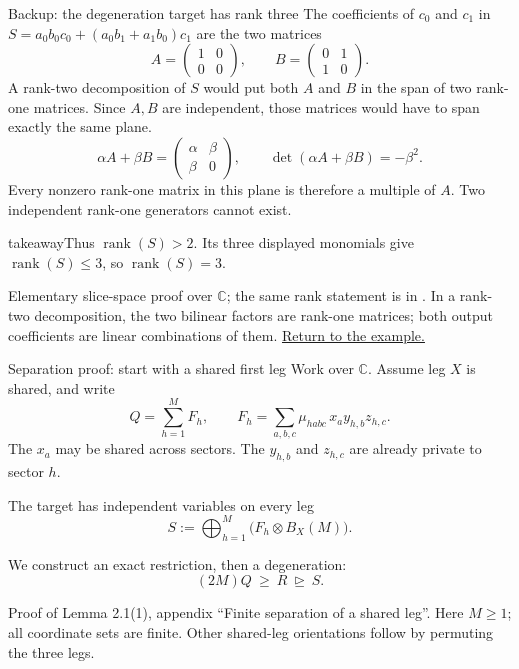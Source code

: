 \documentclass[aspectratio=169,11pt]{beamer}
\newcommand{\CC}{\mathbb C}
\newcommand{\rank}{\operatorname{rank}}
\newcommand{\degen}{\unrhd}
\newcommand{\source}[1]{\vfill\par{\fontsize{7.5}{9}\selectfont\color{muted}#1\par}}
\newcommand{\takeaway}[1]{\begin{beamercolorbox}[sep=0.65em,wd=\linewidth]{takeaway}#1\end{beamercolorbox}}
\begin{document}
\begin{frame}[label=degeneration-rank-proof]{Backup: the degeneration target has rank three}
  The coefficients of $c_0$ and $c_1$ in
  $S=a_0b_0c_0+(a_0b_1+a_1b_0)c_1$ are the two matrices
  \[
    A=\begin{pmatrix}1&0\\0&0\end{pmatrix},\qquad
    B=\begin{pmatrix}0&1\\1&0\end{pmatrix}.
  \]
  A rank-two decomposition of $S$ would put both $A$ and $B$ in the span
  of two rank-one matrices. Since $A,B$ are independent, those matrices
  would have to span exactly the same plane.
  \[
    \alpha A+\beta B=\begin{pmatrix}\alpha&\beta\\\beta&0\end{pmatrix},
    \qquad \det(\alpha A+\beta B)=-\beta^2.
  \]
  Every nonzero rank-one matrix in this plane is therefore a multiple of $A$.
  Two independent rank-one generators cannot exist.
  \par\medskip
  \takeaway{Thus $\rank(S)>2$. Its three displayed monomials give
    $\rank(S)\le3$, so $\rank(S)=3$.}
  \source{Elementary slice-space proof over $\CC$; the same rank statement is in
  \cite[proof of Proposition 13, p.~131]{interpolation}.
  In a rank-two decomposition, the two bilinear factors are rank-one matrices;
  both output coefficients are linear combinations of them.
  \hyperlink{degeneration-example}{Return to the example.}}
\end{frame}

\begin{frame}[label=finite-separation-setup]{Separation proof: start with a shared first leg}
  Work over $\CC$. Assume leg $X$ is shared, and write
  \[
    Q=\sum_{h=1}^{M}F_h,\qquad
    F_h=\sum_{a,b,c}\mu_{habc}\,x_a y_{h,b}z_{h,c}.
  \]
  The $x_a$ may be shared across sectors. The $y_{h,b}$ and $z_{h,c}$
  are already private to sector $h$.
  \begin{block}{The target has independent variables on every leg}
    \[
      S:=\bigoplus_{h=1}^{M}\bigl(F_h\otimes B_X(M)\bigr).
    \]
  \end{block}
  We construct an exact restriction, then a degeneration:
  \[
    (2M)Q\ \ge\ R\ \degen\ S.
  \]
  \source{Proof of Lemma 2.1(1), appendix ``Finite separation of a shared leg''.
  Here $M\ge1$; all coordinate sets are finite. Other shared-leg orientations
  follow by permuting the three legs.}
\end{frame}
\end{document}

